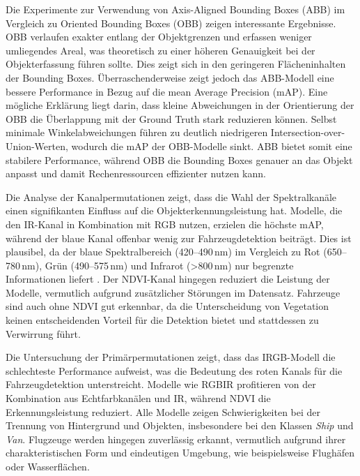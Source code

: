 Die Experimente zur Verwendung von Axis-Aligned Bounding Boxes (ABB) im Vergleich zu Oriented Bounding Boxes (OBB) zeigen interessante Ergebnisse. OBB verlaufen exakter entlang der Objektgrenzen und erfassen weniger umliegendes Areal, was theoretisch zu einer höheren Genauigkeit bei der Objekterfassung führen sollte. Dies zeigt sich in den geringeren Flächeninhalten der Bounding Boxes. Überraschenderweise zeigt jedoch das ABB-Modell eine bessere Performance in Bezug auf die mean Average Precision (mAP). Eine mögliche Erklärung liegt darin, dass kleine Abweichungen in der Orientierung der OBB die Überlappung mit der Ground Truth stark reduzieren können. Selbst minimale Winkelabweichungen führen zu deutlich niedrigeren Intersection-over-Union-Werten, wodurch die mAP der OBB-Modelle sinkt. ABB bietet somit eine stabilere Performance, während OBB die Bounding Boxes genauer an das Objekt anpasst und damit Rechenressourcen effizienter nutzen kann. 

Die Analyse der Kanalpermutationen zeigt, dass die Wahl der Spektralkanäle einen signifikanten Einfluss auf die Objekterkennungsleistung hat. Modelle, die den IR-Kanal in Kombination mit RGB nutzen, erzielen die höchste mAP, während der blaue Kanal offenbar wenig zur Fahrzeugdetektion beiträgt. Dies ist plausibel, da der blaue Spektralbereich (420–490\,nm) im Vergleich zu Rot (650–780\,nm), Grün (490–575\,nm) und Infrarot (>800\,nm) nur begrenzte Informationen liefert . Der NDVI-Kanal hingegen reduziert die Leistung der Modelle, vermutlich aufgrund zusätzlicher Störungen im Datensatz. Fahrzeuge sind auch ohne NDVI gut erkennbar, da die Unterscheidung von Vegetation keinen entscheidenden Vorteil für die Detektion bietet und stattdessen zu Verwirrung führt.

Die Untersuchung der Primärpermutationen zeigt, dass das IRGB-Modell die schlechteste Performance aufweist, was die Bedeutung des roten Kanals für die Fahrzeugdetektion unterstreicht. Modelle wie RGBIR profitieren von der Kombination aus Echtfarbkanälen und IR, während NDVI die Erkennungsleistung reduziert. Alle Modelle zeigen Schwierigkeiten bei der Trennung von Hintergrund und Objekten, insbesondere bei den Klassen \emph{Ship} und \emph{Van}. Flugzeuge werden hingegen zuverlässig erkannt, vermutlich aufgrund ihrer charakteristischen Form und eindeutigen Umgebung, wie beispielsweise Flughäfen oder Wasserflächen.

